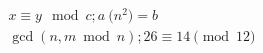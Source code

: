 \documentclass{book}
\begin{document}
\begin{gather*}
x\equiv y\mod c ; a\pod{n^2}=b \\
\gcd(n,m\bmod n); 26\equiv 14\pmod{12}
\end{gather*}
\end{document}
